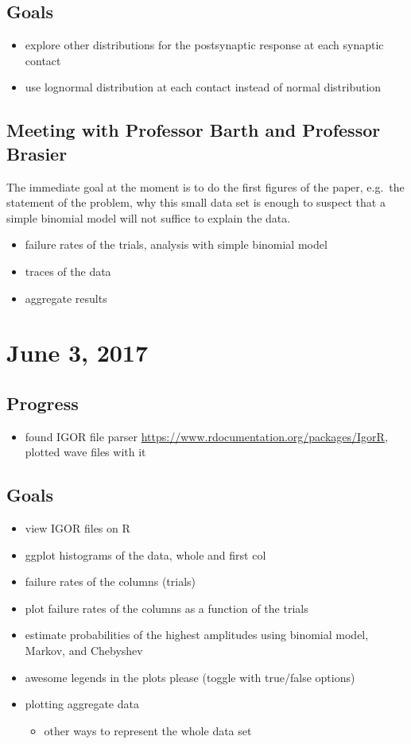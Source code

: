 \documentclass{article}
\begin{document}
\subsection{Goals}
\begin{itemize}
  \item explore other distributions for the postsynaptic response at each synaptic contact
  \item use lognormal distribution at each contact instead of normal distribution
\end{itemize}

\subsection{Meeting with Professor Barth and Professor Brasier}
The immediate goal at the moment is to do the first figures of the paper, e.g.\ the statement of the problem, why this small data set is enough to suspect that a simple binomial model will not suffice to explain the data.
\begin{itemize}
  \item failure rates of the trials, analysis with simple binomial model
  \item traces of the data
  \item aggregate results
\end{itemize}


\section{June 3, 2017}
\subsection{Progress}
\begin{itemize}
  \item found IGOR file parser \url{https://www.rdocumentation.org/packages/IgorR}, plotted wave files with it
\end{itemize}

\subsection{Goals}
\begin{itemize}
  \item view IGOR files on R
  \item ggplot histograms of the data, whole and first col
  \item failure rates of the columns (trials)
  \item plot failure rates of the columns as a function of the trials
  \item estimate probabilities of the highest amplitudes using binomial model, Markov, and Chebyshev
  \item awesome legends in the plots please (toggle with true/false options)
  \item plotting aggregate data
  \begin{itemize}
    \item other ways to represent the whole data set
  \end{itemize}
\end{itemize}
\end{document}
